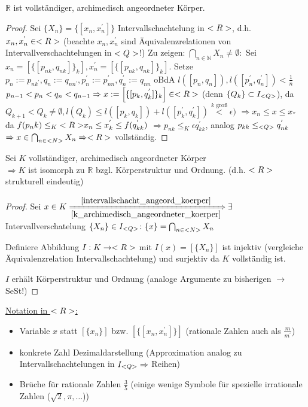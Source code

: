 \begin{theorem}
	$\mathbb{R}$ ist vollständiger, archimedisch angeordneter Körper.
\end{theorem}

\begin{proof}
	Sei $\{X_n\} = \{[x_n, x_n^{'}]\}$ Intervallschachtelung in $<R>$, d.h. $x_n,x_n^{'} \in <R>$
	(beachte $x_n, x_n^{'}$ sind Äquivalenzrelationen von Intervallverschachtelungen in $<Q>$!)
	Zu zeigen: $\bigcap_{n\in\mathbb{N}} X_n \neq \emptyset:$
	Sei $x_n = \left[ \{ [p_{nk},q_{nk}]\}_k \right], x_n^{'} = \left[ \{ [p_{nk},q_{nk}]\}_k \right]$.
	Setze $p_n := p_{nk^{'}}, q_n := q_{nn^{'}}, p^{'}_n := p_{nn}^{'}, q_n^{'} := q_{nn}$
	oBdA $l([p_n,q_n]), l([p_n^{'}, q_{n}^{'}]) < \frac{1}{n}$
	$p_{n-1} < p_n< q_n < q_{n-1} \Rightarrow x := \left[ \{[p_k,q_k^{'}]\}_k\right] \in <R>$ (denn $\{Q_k\} \subset I_{<Q>}$),
	da $Q_{k+1} < Q_k \neq \emptyset, l(Q_k) \le l([p_k,q_k]) + l([p_k^{'},q_k^{'}]) \overset{k \text{ groß}}{<} \epsilon)$
	$\Rightarrow x_n \le x \le x_{''}$ da $f(p_nk) \le_K{<R>} x_n \le x_k^{'} \le f(q_{kk}^{'})$
	$\Rightarrow p_{nk} \le_K{\epsilon} q_{kk}^{'}$, analog $p_{kk} \le_{<Q>} q_{nk}^{'}$
	$\Rightarrow x \in \bigcap_{n\in<N>} X_n \Rightarrow <R> $ vollständig.  
\end{proof}

\begin{theorem}
	Sei $K$ vollständiger, archimedisch angeordneter Körper\\
	$\Rightarrow K$ ist isomorph zu $\mathbb{R}$ bzgl. Körperstruktur und Ordnung. (d.h. $<R>$ strukturell eindeutig)
\end{theorem}

\begin{proof}
	Sei $x \in K \xRightarrow[\ref{k_archimedisch_angeordneter_koerper}]{\ref{intervallschacht_angeord_koerper}} \exists$ Intervallverschatelung $\{X_n\} \in I_{<Q>}\colon \{x\} = \bigcap_{n\in<N>} X_n$
	
	Definiere Abbildung $I: K \to <R>$ mit $I(x) = \left[ \{ X_n \}\right]$ ist injektiv (vergleiche Äquivalenzrelation Intervallschachtelung) und surjektiv da $K$ vollständig ist.
	
	$I$ erhält Körperstruktur und Ordnung (analoge Argumente zu bisherigen $\to$ SeSt!)
\end{proof}

\underline{Notation in $<R>$:}

\begin{itemize}
	\item Variable $x$ statt $\left[ \{x_n \} \right]$ bzw. $\left[\{[x_n,x_n^{'}]\}\right]$ (rationale Zahlen auch als $\frac{m}{m^{'}}$)
	\item konkrete Zahl Dezimaldarstellung (Approximation analog zu Intervallschachtelungen in $I_{<Q>} \Rightarrow$ Reihen)
	\item Brüche für rationale Zahlen $\frac{3}{5}$ (einige wenige Symbole für spezielle irrationale Zahlen ($\sqrt{2}, \pi, \dots$))
\end{itemize}

